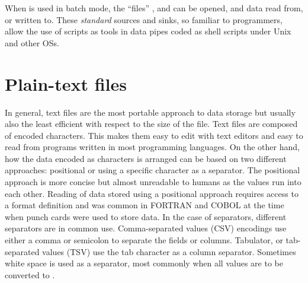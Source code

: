 \documentclass[krantz2]{krantz}\usepackage{knitr}
\begin{document}
\begin{knitrout}\footnotesize
{}\color{fgcolor}\begin{kframe}
\begin{alltt}
  \hlstd{=} \hlstd{)}
\end{alltt}


{\ttfamily\noindent\bfseries\color{errorcolor}{\#\# Error in readLines(f1, n = 2L): object 'f1' not found}}\begin{alltt}
\end{alltt}


{\ttfamily\noindent\bfseries\color{errorcolor}{\#\# Error in close(f1): object 'f1' not found}}\end{kframe}
\end{knitrout}

When \Rpgrm is used in batch mode, the ``files'' ,  and  can be opened, and data read from, or written to. These \emph{standard} sources and sinks, so familiar to \Clang programmers, allow the use of \Rlang scripts as tools in data pipes coded as shell scripts under Unix and other OSs.

\section{Plain-text files}\label{sec:files:txt}
In general, text files are the most portable approach to data storage but usually also the least efficient with respect to the size of the file. Text files are composed of encoded characters. This makes them easy to edit with text editors and easy to read from programs written in most programming languages. On the other hand, how the data encoded as characters is arranged can be based on two different approaches: positional or using a specific character as a separator. The positional approach is more concise but almost unreadable to humans as the values run into each other. Reading of data stored using a positional approach requires access to a format definition and was common in FORTRAN and COBOL at the time when punch cards were used to store data. In the case of separators, different separators are in common use. Comma-separated values (CSV) encodings use either a comma or semicolon to separate the fields or columns. Tabulator, or tab-separated values (TSV) use the tab character as a column separator. Sometimes white space is used as a separator, most commonly when all values are to be converted to .
\end{document}
